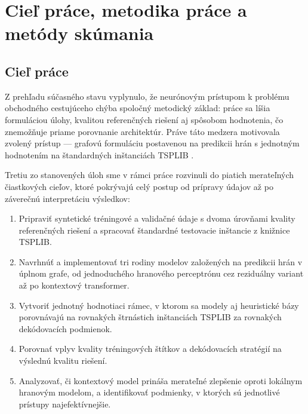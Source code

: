 ﻿\chapter{Cieľ práce, metodika práce a metódy skúmania}

\section{Cieľ práce}
\label{sec:ciel}

\indent Z prehľadu súčasného stavu vyplynulo, že neurónovým prístupom
k problému obchodného cestujúceho chýba spoločný metodický základ:
práce sa líšia formuláciou úlohy, kvalitou referenčných riešení aj
spôsobom hodnotenia, čo znemožňuje priame porovnanie architektúr.
Práve táto medzera motivovala zvolený prístup — grafovú formuláciu
postavenou na predikcii hrán s jednotným hodnotením na štandardných
inštanciách TSPLIB
\parencite{joshi2022generalization,bengio2021mlco,reinelt1991tsplib}.

\AssignmentGoalSK

\indent Tretiu zo stanovených úloh sme v rámci práce rozvinuli do
piatich merateľných čiastkových cieľov, ktoré pokrývajú celý postup
od prípravy údajov až po záverečnú interpretáciu výsledkov:

\begin{enumerate}
    \item Pripraviť syntetické tréningové a validačné údaje s dvoma
          úrovňami kvality referenčných riešení a spracovať štandardné
          testovacie inštancie z knižnice TSPLIB.
    \item Navrhnúť a implementovať tri rodiny modelov založených na
          predikcii hrán v úplnom grafe, od jednoduchého hranového
          perceptrónu cez reziduálny variant až po kontextový transformer.
    \item Vytvoriť jednotný hodnotiaci rámec, v ktorom sa modely aj
          heuristické bázy porovnávajú na rovnakých štrnástich inštanciách
          TSPLIB za rovnakých dekódovacích podmienok.
    \item Porovnať vplyv kvality tréningových štítkov a dekódovacích
          stratégií na výslednú kvalitu riešení.
    \item Analyzovať, či kontextový model prináša merateľné zlepšenie
          oproti lokálnym hranovým modelom, a identifikovať podmienky,
          v ktorých sú jednotlivé prístupy najefektívnejšie.
\end{enumerate}

